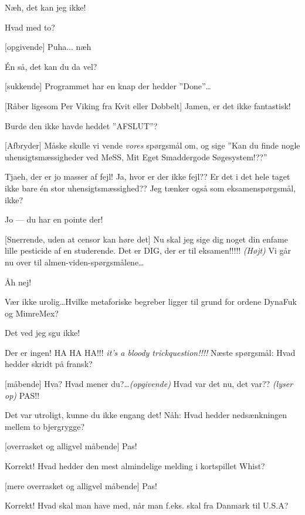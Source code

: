 \documentclass{article}
\begin{document}
\begin{sketch}
 Næh, det kan jeg ikke!

 Hvad med to?

 [opgivende] Puha... næh

 \'En så, det kan du da vel?

 [sukkende] Programmet har en knap der hedder ''Done''\ldots

 [Råber ligesom Per Viking fra Kvit eller Dobbelt] Jamen, er det
ikke fantastisk!

 Burde den ikke havde heddet ''AFSLUT''?

 [Afbryder] Måske skulle vi vende {\em vores} spørgsmål om,
og sige ''Kan du finde nogle uhensigtsmæssigheder ved MeSS, Mit Eget
Smaddergode Søgesystem!??''

 Tjaeh, der er jo masser af fejl! Ja, hvor er der ikke
fejl?? Er det i det hele taget ikke bare \'en stor uhensigtsmæssighed??
Jeg tænker også som eksamenspørgsmål, ikke?

 Jo --- du har en pointe der!

 [Snerrende, uden at censor kan høre det] Nu skal jeg sige dig
noget din enfame lille pesticide af en studerende. Det er DIG, der er til
eksamen!!!!! {\em (Højt)\/} Vi går nu over til
almen-viden-spørgsmålene\ldots

 Åh nej!

 Vær ikke urolig\ldots Hvilke metaforiske begreber ligger til grund
for ordene DynaFuk og MimreMex?

 Det ved jeg sgu ikke!

 Der er ingen! HA HA HA!!! {\em it's a bloody trickquestion!!!!}
Næste spørgsmål: Hvad hedder skridt på fransk?

 [måbende] Hva? Hvad mener du?\ldots {\em (opgivende)\/} Hvad
var det nu, det var?? {\em (lyser op)\/} PAS!!

 Det var utroligt, kunne du ikke engang det! Nåh: Hvad hedder
nedsænkningen mellem to bjergrygge?

 [overrasket og alligvel måbende] Pas!

 Korrekt! Hvad hedder den mest almindelige melding i kortspillet
Whist?

 [mere overrasket og alligvel måbende] Pas!

 Korrekt! Hvad skal man have med, når man f.eks. skal fra
Danmark til U.S.A?


\end{sketch}
\end{document}
